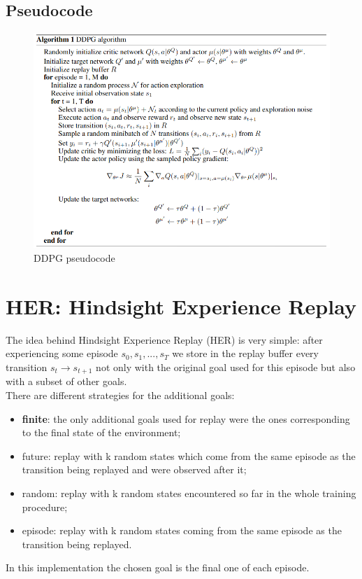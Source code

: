 \documentclass[12pt]{report}
\begin{document}
\subsection{Pseudocode}
\begin{figure}[H]
    \begin{center}
    \includegraphics[scale=0.6]{ddpg_pseudocode.png}
    \end{center}
    \caption{DDPG pseudocode}
    \centering
\end{figure}


\section{HER: Hindsight Experience Replay}
The idea behind Hindsight Experience Replay (HER) is very simple: after experiencing some episode $s_0, s_1,..., s_T$ we store in the replay buffer every transition $s_t \rightarrow s_{t+1}$ not only with the original goal used for this episode but also with a subset of other goals. \\
There are different strategies for the additional goals:
\begin{itemize}
	\item \textbf{finite}: the only additional goals used for replay were the ones corresponding to the final state of the environment;
	\item future: replay with k random states which come from the same episode as the transition 	being replayed and were observed after it;
	\item random: replay with k random states encountered so far in the whole training procedure;
	\item episode: replay with k random states coming from the same episode as the transition			being replayed.
\end{itemize}
In this implementation the chosen goal is the final one of each episode.
\end{document}
